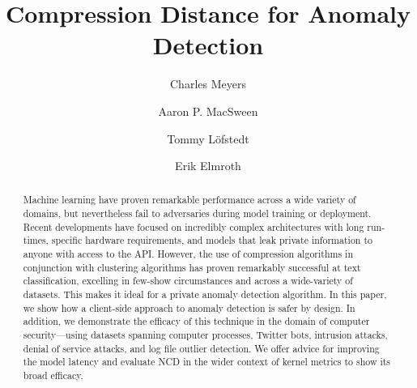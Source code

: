 \documentclass[sigconf]{acmart}
\begin{document}
\title{Compression Distance for Anomaly Detection}

\author{Charles Meyers}
\author{Aaron P. MacSween}
\author{Tommy Löfstedt}
\author{Erik Elmroth}


\begin{abstract}
  Machine learning have proven remarkable performance across a wide variety of domains, but nevertheless fail to adversaries during model training or deployment. 
  Recent developments have focused on incredibly complex architectures with long run-times, specific hardware requirements, and models that leak private information to anyone with access to the API.  
  However, the use of compression algorithms in conjunction with clustering algorithms has proven remarkably successful at text classification, excelling in few-show circumstances and across a wide-variety of datasets. This makes it ideal for a private anomaly detection algorithm. In this paper, we show how a client-side approach to anomaly detection is safer by design.
  In addition, we demonstrate the efficacy of this technique in the domain of computer security---using datasets spanning computer processes, Twitter bots, intrusion attacks, denial of service attacks, and log file outlier detection.
  We offer advice for improving the model latency and evaluate NCD in the wider context of kernel metrics to show its broad efficacy.
    
\end{abstract}


\end{document}

